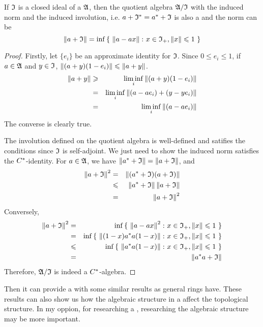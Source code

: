 \documentclass[a4paper,11pt]{report}
\begin{document}
\begin{thm}
	If $\mathfrak{I}$ is a closed ideal of a \Cs $\mathfrak{A}$, then the quotient algebra $\mathfrak{A} / \mathfrak{I}$ with the induced norm and the induced involution, i.e. $a+\mathfrak{I}^{*} = a^{*}+\mathfrak{I}$ is also a \Cs and the norm can be
	\begin{equation*}
		\left\lVert a+\mathfrak{I}\right\lVert = \inf{\{~\left\lVert a-ax\right\lVert \colon x \in \mathfrak{I}_{+}, \left\lVert x\right\lVert \leqslant 1~\}}
	\end{equation*}
\end{thm}
\begin{proof}
	Firstly, let $\{e_i\}$ be an approximate identity for $\mathfrak{I}$. Since $0 \leqslant e_i \leqslant 1$, if $a \in \mathfrak{A}$ and $y \in \mathfrak{I}$, $\left\lVert(a+y)(1-e_i)\right\lVert \leqslant \left\lVert a+y\right\lVert$.
	\begin{eqnarray*}
		\left\lVert a+y\right\lVert &\geqslant& \liminf_{i} \left\lVert(a+y)(1-e_i)\right\lVert \\
		&=& \liminf_{i} \left\lVert(a-ae_i)+(y-ye_i)\right\lVert \\
		&=& \liminf_{i} \left\lVert(a-ae_i)\right\lVert
	\end{eqnarray*}
	The converse is clearly true.
	\item The involution defined on the quotient algebra is well-defined and satifies the conditions since $\mathfrak{I}$ is self-adjoint. We just need to show the induced norm satisfies the $C^{*}$-identity. For $a \in \mathfrak{A}$, we have $\left\lVert a^{*}+\mathfrak{I}\right\lVert = \left\lVert a+\mathfrak{I}\right\lVert$, and 
	\begin{eqnarray*}
		\left\lVert a+\mathfrak{I}\right\lVert^2 &=& \left\lVert(a^{*}+\mathfrak{I})(a+\mathfrak{I})\right\lVert \\
		&\leqslant& \left\lVert a^{*}+\mathfrak{I}\right\lVert\left\lVert a+\mathfrak{I}\right\lVert \\
		&=& \left\lVert a+\mathfrak{I}\right\lVert^2
	\end{eqnarray*}
	Conversely,
	\begin{eqnarray*}
		\left\lVert a+\mathfrak{I}\right\lVert^2 &=& \inf{\{~\left\lVert a-ax\right\lVert^2 \colon x \in \mathfrak{I}_{+}, \left\lVert x\right\lVert \leqslant 1~\}}\\
		&=& \inf{\{~\left\lVert(1-x)a^{*}a(1-x)\right\lVert \colon x \in \mathfrak{I}_{+}, \left\lVert x\right\lVert \leqslant 1~\}}\\
		&\leqslant& \inf{\{~\left\lVert a^{*}a(1-x)\right\lVert \colon x \in \mathfrak{I}_{+}, \left\lVert x\right\lVert \leqslant 1~\}}\\
		&=& \left\lVert a^{*}a+\mathfrak{I}\right\lVert
	\end{eqnarray*}
	Therefore, $\mathfrak{A} / \mathfrak{I}$ is indeed a $C^{*}$-algebra.
\end{proof}

Then it can provide a \Cs with some similar results as general rings have. These results can also show us how the algebraic structure in a \Cs affect the topological structure. In my oppion, for researching a \Cs, researching the algebraic structure may be more important.
\end{document}

